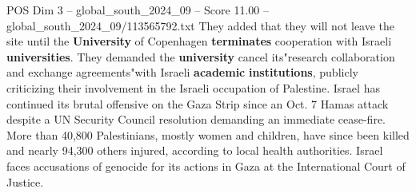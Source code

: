 \begin{textsample}{POS Dim 3 – global\_south\_2024\_09 – Score 11.00 – global\_south\_2024\_09/113565792.txt}
They added that they will not leave the site until the \textbf{University} of Copenhagen \textbf{terminates} cooperation with Israeli \textbf{universities}.
They demanded the \textbf{university} cancel its"research collaboration and exchange agreements"with Israeli \textbf{academic} \textbf{institutions}, publicly criticizing their involvement in the Israeli occupation of Palestine.
Israel has continued its brutal offensive on the Gaza Strip since an Oct. 7 Hamas attack despite a UN Security Council resolution demanding an immediate cease-fire.
More than 40,800 Palestinians, mostly women and children, have since been killed and nearly 94,300 others injured, according to local health authorities.
Israel faces accusations of genocide for its actions in Gaza at the International Court of Justice.

\end{textsample}
